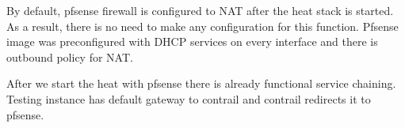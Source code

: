 By default, pfsense firewall is configured to NAT after the heat stack is started. As a result, there is no need to make any configuration for this function. Pfsense image was preconfigured with DHCP services on every interface and there is outbound policy for NAT.

After we start the heat with pfsense there is already functional service chaining. Testing instance has default gateway to contrail and contrail redirects it to pfsense.



